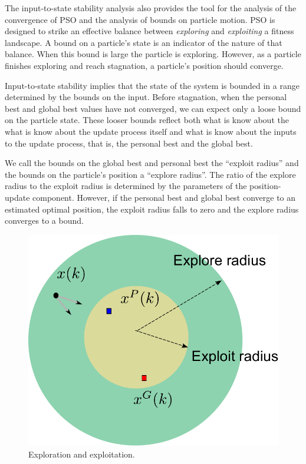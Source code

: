 \documentclass{sig-alternate}
\begin{document}
The input-to-state stability analysis also provides the tool for the analysis of the convergence of PSO and the analysis of bounds on particle motion.
PSO is designed to strike an effective balance between \emph{exploring} and \emph{exploiting} a fitness landscape.
A bound on a particle's state is an indicator of the nature of that balance.
When this bound is large the particle is exploring.
However, as a particle finishes exploring and reach stagnation, a particle's position should converge.

Input-to-state stability implies that the state of the system is bounded in a range determined by the bounds on the input.
Before stagnation, when the personal best and global best values have not converged, we can expect only a loose bound on the particle state.
These looser bounds reflect both what is know about the what is know about the update process itself and what is know about the inputs to the update process, that is, the personal best and the global best.

We call the bounds on the global best and personal best the ``exploit radius'' and the bounds on the particle's position a ``explore radius''.
The ratio of the explore radius to the exploit radius is determined by the parameters of the position-update component.
However, if the personal best and global best converge to an estimated optimal position, the exploit radius falls to zero and the explore radius converges to a bound.

\begin{figure}
\centering
\includegraphics[width=0.6\linewidth]{./explore_and_exploit.pdf}
\caption{Exploration and exploitation.}
\label{fig:explore_and_exploit}
\end{figure}

\end{document}
